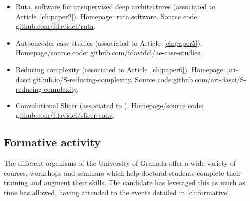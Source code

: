 \begin{itemize}
    \item Ruta, software for unsupervised deep architectures (associated to Article~\ref{ch:paper2}). Homepage: \href{https://ruta.software/}{ruta.software}. Source code: \href{https://github.com/fdavidcl/ruta}{github.com/fdavidcl/ruta}.
    \item Autoencoder case studies (associated to Article~\ref{ch:paper5}). Homepage/source code: \href{https://github.com/ari-dasci/S-autoencoder-case-studies}{github.com/fdavidcl/ae-case-studies}.
    \item Reducing complexity (associated to Article~\ref{ch:paper6}). Homepage: \href{https://ari-dasci.github.io/S-reducing-complexity/}{ari-dasci.github.io/S-reducing-complexity}. Source code:\newline \href{https://github.com/ari-dasci/S-reducing-complexity}{github.com/ari-dasci/S-reducing-complexity}.
    \item Convolutional Slicer (associated to ). Homepage/source code: \href{https://github.com/fdavidcl/slicer-conv}{github.com/fdavidcl/slicer-conv}.
\end{itemize}


\subsection{Formative activity}


The different organisms of the University of Granada offer a wide variety of courses, workshops and seminars which help doctoral students complete their training and augment their skills. The candidate has leveraged this as much as time has allowed, having attended to the events detailed in \autoref{ch:formative}.

